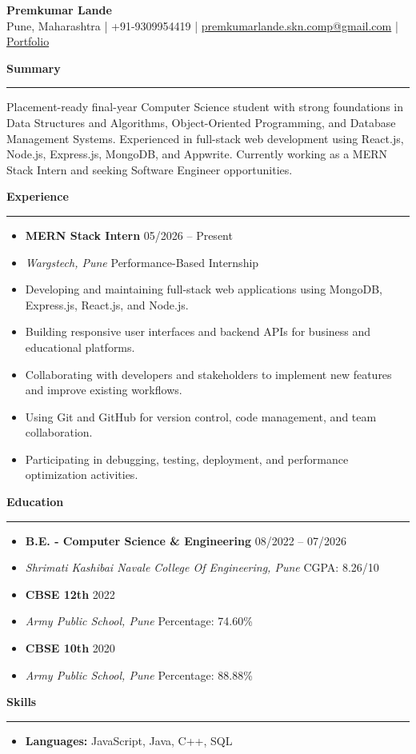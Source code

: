 \documentclass[a4paper,11pt]{article}
\newcommand{\myName}[1]{\Huge \textbf{#1}}
\newcommand{\myContact}[1]{\small #1}
\newcommand{\sectionTitle}[1]{
    \par\vspace{12pt}
    \Needspace{3\baselineskip}
    \noindent\textbf{\large #1}
    \par\vspace{2pt}\hrule\vspace{6pt}
}
\newcommand{\resumeEntry}[4]{
    \begin{itemize}[leftmargin=*, label={}]
        \item \textbf{#1} \hfill #2
        \item \textit{#3} \hfill #4
    \end{itemize}
}
\newcommand{\descriptionItem}[1]{
    \begin{itemize}[leftmargin=2em, itemsep=4pt, topsep=4pt]
        \item #1
    \end{itemize}
}
\newcommand{\skillList}[2]{
    \begin{itemize}[leftmargin=*, label={}]
        \item \textbf{#1:} #2
    \end{itemize}
}
\begin{document}
\begin{center}
    \myName{Premkumar Lande} \\[4pt]
    \myContact{
    Pune, Maharashtra |
    +91-9309954419 |
    \href{mailto:premkumarlande.skn.comp@gmail.com}{premkumarlande.skn.comp@gmail.com} |
    \href{https://premkumar324.github.io/projects/index.html}{Portfolio}
    }
\end{center}

\sectionTitle{Summary}

Placement-ready final-year Computer Science student with strong foundations in Data Structures and Algorithms, Object-Oriented Programming, and Database Management Systems. Experienced in full-stack web development using React.js, Node.js, Express.js, MongoDB, and Appwrite. Currently working as a MERN Stack Intern and seeking Software Engineer opportunities.

\sectionTitle{Experience}

\resumeEntry
{MERN Stack Intern}
{05/2026 -- Present}
{Wargstech, Pune}
{Performance-Based Internship}

\descriptionItem{Developing and maintaining full-stack web applications using MongoDB, Express.js, React.js, and Node.js.}

\descriptionItem{Building responsive user interfaces and backend APIs for business and educational platforms.}

\descriptionItem{Collaborating with developers and stakeholders to implement new features and improve existing workflows.}

\descriptionItem{Using Git and GitHub for version control, code management, and team collaboration.}

\descriptionItem{Participating in debugging, testing, deployment, and performance optimization activities.}

\sectionTitle{Education}

\resumeEntry
{B.E. - Computer Science \& Engineering}
{08/2022 -- 07/2026}
{Shrimati Kashibai Navale College Of Engineering, Pune}
{CGPA: 8.26/10}

\resumeEntry
{CBSE 12th}
{2022}
{Army Public School, Pune}
{Percentage: 74.60\%}

\resumeEntry
{CBSE 10th}
{2020}
{Army Public School, Pune}
{Percentage: 88.88\%}

\sectionTitle{Skills}

\skillList{Languages}{JavaScript, Java, C++, SQL}
\end{document}
